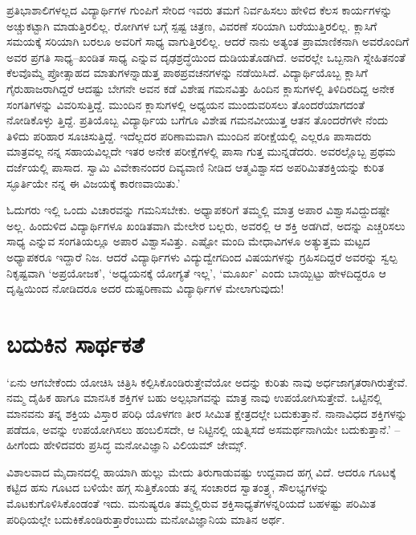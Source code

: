 ಪ್ರತಿಭಾಶಾಲಿಗಳಲ್ಲದ ವಿದ್ಯಾರ್ಥಿಗಳ ಗುಂಪಿಗೆ ಸೇರಿದ ಇವರು ತಮಗೆ ನಿರ್ವಹಿಸಲು ಹೇಳಿದ ಕೆಲಸ ಕಾರ್ಯಗಳನ್ನು ಅಚ್ಚುಕಟ್ಟಾಗಿ ಮಾಡುತ್ತಿರಲಿಲ್ಲ. ರೋಗಿಗಳ ಬಗ್ಗೆ ಸ್ಪಷ್ಟ ಚಿತ್ರಣ, ವಿವರಣೆ ಸರಿಯಾಗಿ ಬರೆಯುತ್ತಿರಲಿಲ್ಲ. ಕ್ಲಾಸಿಗೆ ಸಮಯಕ್ಕೆ ಸರಿಯಾಗಿ ಬರಲೂ ಅವರಿಗೆ ಸಾಧ್ಯ ವಾಗುತ್ತಿರಲಿಲ್ಲ. ಆದರೆ ನಾನು ಅತ್ಯಂತ ಪ್ರಾಮಾಣಿಕನಾಗಿ ಅವರೊಂದಿಗೆ ಅವರ ಪ್ರಗತಿ ಸಾಧ್ಯ–ಖಂಡಿತ ಸಾಧ್ಯ ಎನ್ನುವ ದೃಢಶ್ರದ್ಧೆಯಿಂದ ದುಡಿಯತೊಡಗಿದೆ. ಅವರಲ್ಲೇ ಒಬ್ಬನಾಗಿ ಸ್ನೇಹಿತನಂತೆ ಕೆಲವೊಮ್ಮೆ ಪ್ರೋತ್ಸಾಹದ ಮಾತುಗಳನ್ನಾಡುತ್ತ ಪಾಠಪ್ರವಚನಗಳನ್ನು ನಡೆಯಿಸಿದೆ. ವಿದ್ಯಾರ್ಥಿಯೊಬ್ಬ ಕ್ಲಾಸಿಗೆ ಗೈರುಹಾಜರಾಗಿದ್ದರೆ ಆದಷ್ಟು ಬೇಗನೇ ಅವನ ಕಡೆ ವಿಶೇಷ ಗಮನವಿತ್ತು ಹಿಂದಿನ ಕ್ಲಾಸುಗಳಲ್ಲಿ ತಿಳಿದಿರದಿದ್ದ ಅನೇಕ ಸಂಗತಿಗಳನ್ನು ವಿವರಿಸುತ್ತಿದ್ದೆ. ಮುಂದಿನ ಕ್ಲಾಸುಗಳಲ್ಲಿ ಅಧ್ಯಯನ ಮುಂದುವರಿಸಲು ತೊಂದರೆಯಾಗದಂತೆ ನೋಡಿಕೊಳ್ಳು ತ್ತಿದ್ದೆ. ಪ್ರತಿಯೊಬ್ಬ ವಿದ್ಯಾರ್ಥಿಯ ಬಗೆಗೂ ವಿಶೇಷ ಗಮನವೀಯುತ್ತ ಆತನ ತೊಂದರೆಗಳೇ ನೆಂದು ತಿಳಿದು ಪರಿಹಾರ ಸೂಚಿಸುತ್ತಿದ್ದೆ. ಇದೆಲ್ಲದರ ಪರಿಣಾಮವಾಗಿ ಮುಂದಿನ ಪರೀಕ್ಷೆಯಲ್ಲಿ ಎಲ್ಲರೂ ಪಾಸಾದರು ಮಾತ್ರವಲ್ಲ ನನ್ನ ಸಹಾಯವಿಲ್ಲದೇ ಇತರ ಅನೇಕ ಪರೀಕ್ಷೆಗಳಲ್ಲಿ ಪಾಸಾ ಗುತ್ತ ಮುನ್ನಡೆದರು. ಅವರಲ್ಲೊಬ್ಬ ಪ್ರಥಮ ದರ್ಜೆಯಲ್ಲಿ ಪಾಸಾದ. ಸ್ವಾಮಿ ವಿವೇಕಾನಂದರ ದಿವ್ಯವಾಣಿ ನೀಡಿದ ಆತ್ಮವಿಶ್ವಾಸದ ಅಪರಿಮಿತಶಕ್ತಿಯನ್ನು ಕುರಿತ ಸ್ಫೂರ್ತಿಯೇ ನನ್ನ ಈ ವಿಜಯಕ್ಕೆ ಕಾರಣವಾಯಿತು.’

ಓದುಗರು ಇಲ್ಲಿ ಒಂದು ವಿಚಾರವನ್ನು ಗಮನಿಸಬೇಕು. ಅಧ್ಯಾಪಕರಿಗೆ ತಮ್ಮಲ್ಲಿ ಮಾತ್ರ ಅಪಾರ ವಿಶ್ವಾಸವಿದ್ದುದಷ್ಟೇ ಅಲ್ಲ. ಹಿಂದುಳಿದ ವಿದ್ಯಾರ್ಥಿಗಳೂ ಖಂಡಿತವಾಗಿ ಮೇಲೇರ ಬಲ್ಲರು, ಅವರಲ್ಲಿ ಆ ಶಕ್ತಿ ಅಡಗಿದೆ, ಅದನ್ನು ಎಚ್ಚರಿಸಲು ಸಾಧ್ಯ ಎನ್ನುವ ಸಂಗತಿಯಲ್ಲೂ ಅಪಾರ ವಿಶ್ವಾಸವಿತ್ತು. ಎಷ್ಟೋ ಮಂದಿ ಮೇಧಾವಿಗಳೂ ಅತ್ಯುತ್ತಮ ಮಟ್ಟದ ಅಧ್ಯಾಪಕರೂ ಇದ್ದಾರೆ ನಿಜ. ಆದರೆ ವಿದ್ಯಾರ್ಥಿಗಳು ವಿದ್ಯುದ್ವೇಗದಿಂದ ವಿಷಯಗಳನ್ನು ಗ್ರಹಿಸದಿದ್ದರೆ ಅವರನ್ನು ಸ್ವಲ್ಪ ನಿಕೃಷ್ಟವಾಗಿ ‘ಅಪ್ರಯೋಜಕ’, ‘ಅಧ್ಯಯನಕ್ಕೆ ಯೋಗ್ಯತೆ ಇಲ್ಲ’, ‘ಮೂರ್ಖ’ ಎಂದು ಬಾಯ್ಬಿಟ್ಟು ಹೇಳದಿದ್ದರೂ ಆ ದೃಷ್ಟಿಯಿಂದ ನೋಡಿದರೂ ಅದರ ದುಷ್ಪರಿಣಾಮ ವಿದ್ಯಾರ್ಥಿಗಳ ಮೇಲಾಗುವುದು!


\section*{ಬದುಕಿನ ಸಾರ್ಥಕತೆ}

\vskip -8pt

‘ಏನು ಆಗಬೇಕೆಂದು ಯೋಚಿಸಿ ಚಿತ್ರಿಸಿ ಕಲ್ಪಿಸಿಕೊಂಡಿರುತ್ತೇವೆಯೋ ಅದನ್ನು ಕುರಿತು ನಾವು ಅರ್ಧಜಾಗೃತರಾಗಿರುತ್ತೇವೆ. ನಮ್ಮ ದೈಹಿಕ ಹಾಗೂ ಮಾನಸಿಕ ಶಕ್ತಿಗಳ ಬಹು ಅಲ್ಪಭಾಗವನ್ನು ಮಾತ್ರ ನಾವು ಉಪಯೋಗಿಸುತ್ತೇವೆ. ಒಟ್ಟಿನಲ್ಲಿ ಮಾನವನು ತನ್ನ ಶಕ್ತಿಯ ವಿಸ್ತಾರ ಪರಿಧಿ ಯೊಳಗಣ ತೀರ ಸೀಮಿತ ಕ್ಷೇತ್ರದಲ್ಲೇ ಬದುಕುತ್ತಾನೆ. ನಾನಾವಿಧದ ಶಕ್ತಿಗಳನ್ನು ಪಡೆದೂ, ಅವನ್ನು ಉಪಯೋಗಿಸಲು ಹಂಬಲಿಸದೇ, ಆ ನಿಟ್ಟಿನಲ್ಲಿ ಯತ್ನಿಸದೆ ಅಸಮರ್ಥನಾಗಿಯೇ ಬದುಕುತ್ತಾನೆ.’ –ಹೀಗೆಂದು ಹೇಳಿದವರು ಪ್ರಸಿದ್ಧ ಮನೋವಿಜ್ಞಾನಿ ವಿಲಿಯಮ್ ಜೇಮ್ಸ್.

ವಿಶಾಲವಾದ ಮೈದಾನದಲ್ಲಿ ಹಾಯಾಗಿ ಹುಲ್ಲು ಮೇದು ತಿರುಗಾಡುವಷ್ಟು ಉದ್ದವಾದ ಹಗ್ಗ ವಿದೆ. ಆದರೂ ಗೂಟಕ್ಕೆ ಕಟ್ಟಿದ ಹಸು ಗೂಟದ ಬಳಿಯೇ ಹಗ್ಗ ಸುತ್ತಿಕೊಂಡು ತನ್ನ ಸಂಚಾರದ ಸ್ವಾತಂತ್ರ್ಯ, ಸೌಲಭ್ಯಗಳನ್ನು ಮೊಟಕುಗೊಳಿಸಿಕೊಂಡಂತೆ ಇದು. ಮನುಷ್ಯರೂ ತಮ್ಮಲ್ಲಿರುವ ಶಕ್ತಿಸಾಧ್ಯತೆಗಳನ್ನರಿಯದೆ ಬಹಳಷ್ಟು ಪರಿಮಿತ ಪರಿಧಿಯಲ್ಲೇ ಬದುಕಿಕೊಂಡಿರುತ್ತಾರೆಂಬುದು ಮನೋವಿಜ್ಞಾನಿಯ ಮಾತಿನ ಅರ್ಥ.

